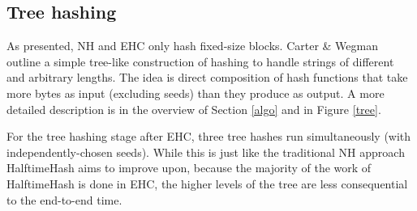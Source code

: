 \documentclass[sigconf, nonacm]{acmart}
\begin{document}

\subsection{Tree hashing}

As presented, NH and EHC only hash fixed-size blocks.
Carter \& Wegman outline a simple tree-like construction of hashing to handle strings of different and arbitrary lengths. \cite{badger,carter-wegman-79}
The idea is direct composition of hash functions that take more bytes as input (excluding seeds) than they produce as output.
A more detailed description is in the overview of Section \ref{algo} and in Figure \ref{tree}.

For the tree hashing stage after EHC, three tree hashes run simultaneously (with independently-chosen seeds).
While this is just like the traditional NH approach HalftimeHash aims to improve upon, because the majority of the work of HalftimeHash is done in EHC, the higher levels of the tree are less consequential to the end-to-end time.







\end{document}
